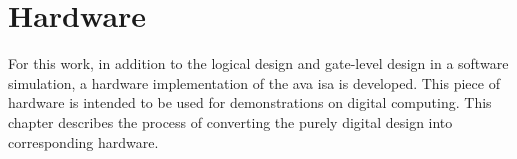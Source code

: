 \clearpage
\section{Hardware}

For this work, in addition to the logical design and gate-level design in a software simulation, a hardware implementation of the \ac{ava} \ac{isa} is developed. This piece of hardware is intended to be used for demonstrations on digital computing. This chapter describes the process of converting the purely digital design into corresponding hardware.






